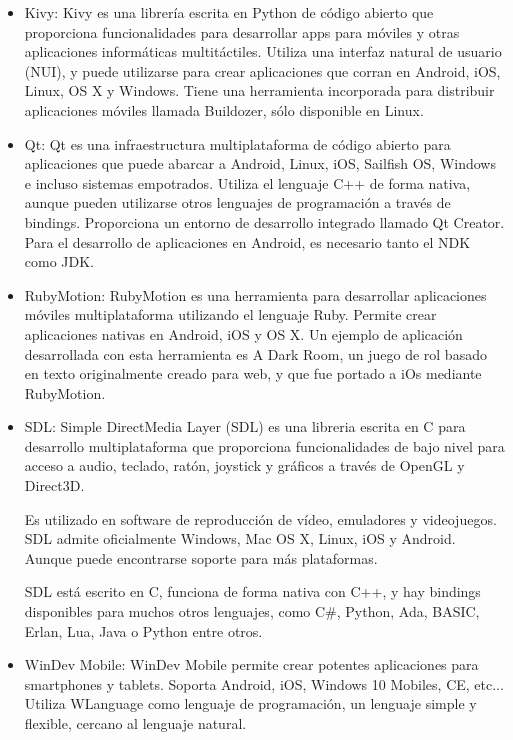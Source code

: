 \documentclass[
10pt, %
a4paper, %
oneside, %
headinclude,footinclude, %
BCOR5mm, %
]{scrartcl}
\begin{document}
\begin{itemize}
	\item Kivy: Kivy es una librería escrita en Python de código abierto que proporciona funcionalidades para desarrollar apps para móviles y otras aplicaciones informáticas multitáctiles. Utiliza una interfaz natural de usuario (NUI), y puede utilizarse para crear aplicaciones que corran en Android, iOS, Linux, OS X y Windows. Tiene una herramienta incorporada para distribuir aplicaciones móviles llamada Buildozer, sólo disponible en Linux. 

	\item Qt: Qt es una infraestructura multiplataforma de código abierto para  aplicaciones que puede abarcar a Android, Linux, iOS, Sailfish OS, Windows e incluso sistemas empotrados. Utiliza el lenguaje C++ de forma nativa, aunque pueden utilizarse otros lenguajes de programación a través de bindings. Proporciona un entorno de desarrollo integrado llamado Qt Creator. Para el desarrollo de aplicaciones en Android, es necesario tanto el NDK como JDK.

	\item RubyMotion: RubyMotion es una herramienta para desarrollar aplicaciones móviles multiplataforma utilizando el lenguaje Ruby. Permite crear aplicaciones nativas en Android, iOS y OS X. Un ejemplo de aplicación desarrollada con esta herramienta es A Dark Room, un juego de rol basado en texto originalmente creado para web, y que fue portado a iOs mediante RubyMotion.

	\item SDL: Simple DirectMedia Layer (SDL) es una libreria escrita en C para desarrollo multiplataforma que proporciona funcionalidades de bajo nivel para acceso a audio, teclado, ratón, joystick y gráficos a través de OpenGL y Direct3D. 

	Es utilizado en software de reproducción de vídeo, emuladores y videojuegos. SDL admite oficialmente Windows, Mac OS X, Linux, iOS y Android. Aunque puede encontrarse soporte para más plataformas.

	SDL está escrito en C, funciona de forma nativa con C++, y hay bindings disponibles para muchos otros lenguajes, como C\#, Python, Ada, BASIC, Erlan, Lua, Java o Python entre otros.

	\item WinDev Mobile: WinDev Mobile  permite crear potentes aplicaciones para smartphones y tablets. Soporta Android, iOS, Windows 10 Mobiles, CE, etc... Utiliza WLanguage como lenguaje de programación, un lenguaje simple y flexible, cercano al lenguaje natural.


\end{itemize}
\end{document}
